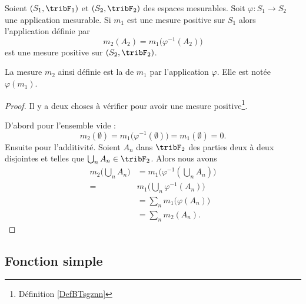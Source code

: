 \begin{proposition}
    Soient \( (S_1,\tribF_1)\) et \( (S_2,\tribF_2)\) des espaces mesurables. Soit \( \varphi\colon S_1\to S_2\) une application mesurable. Si \( m_1\) est une mesure positive sur \( S_1\) alors l'application définie par
    \begin{equation}
        m_2(A_2)=m_1\big( \varphi^{-1}(A_2) \big)
    \end{equation}
    est une mesure positive sur \( (S_2,\tribF_2)\).
\end{proposition}

\begin{definition}
    La mesure \( m_2\) ainsi définie est la  de \( m_1\) par l'application \( \varphi\). Elle est notée \( \varphi(m_1)\).
\end{definition}

\begin{proof}
    Il y a deux choses à vérifier pour avoir une mesure positive\footnote{Définition \ref{DefBTsgznn}}.

    D'abord pour l'ensemble vide :
    \begin{equation}
        m_2(\emptyset)=m_1\big( \varphi^{-1}(\emptyset) \big)=m_1(\emptyset)=0.
    \end{equation}
    Ensuite pour l'additivité. Soient \( A_n\) dans \( \tribF_2\) des parties deux à deux disjointes et telles que \( \bigcup_nA_n\in\tribF_2\). Alors nous avons
    \begin{subequations}
        \begin{align}
            m_2\big( \bigcup_nA_n \big)&=m_1\Big( \varphi^{-1}(\bigcup_nA_n) \Big)\\
            =&m_1\big( \bigcup_n\varphi^{-1}(A_n) \big)\\
            &=\sum_nm_1\big( \varphi(A_n) \big)\\
            &=\sum_nm_2(A_n).
        \end{align}
    \end{subequations}
\end{proof}

\subsection{Fonction simple}

